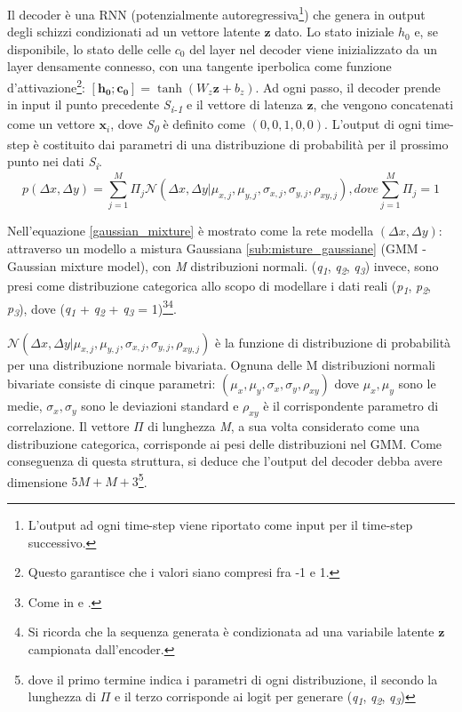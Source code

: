 Il decoder è una RNN (potenzialmente autoregressiva\footnote{L'output ad ogni time-step viene riportato come input per il time-step successivo.}) che genera in output degli schizzi condizionati ad un vettore latente $\boldsymbol{z}$ dato. Lo stato iniziale $h_0$ e, se disponibile, lo stato delle celle $c_0$ del layer nel decoder viene inizializzato da un layer densamente connesso, con una tangente iperbolica come funzione d'attivazione\footnote{Questo garantisce che i valori siano compresi fra -1 e 1.}: $[\boldsymbol{h_0} ; \boldsymbol{c_0}] = \tanh(W_z \boldsymbol{z} + b_z)$.
Ad ogni passo, il decoder prende in input il punto precedente \textit{S\textsubscript{i-1}} e il vettore di latenza $\boldsymbol{z}$, che vengono concatenati come un vettore $\boldsymbol{x}_i$, dove \textit{S\textsubscript{0}} è definito come $(0, 0, 1, 0, 0)$. L'output di ogni time-step è costituito dai parametri di una distribuzione di probabilità per il prossimo punto nei dati \textit{S\textsubscript{i}}.
\begin{equation}
	\label{gaussian_mixture}
	p(\Delta x, \Delta y) = \sum_{j=1}^M \Pi_j \mathcal{N}(\Delta x, \Delta y | \mu_{x,j}, \mu_{y,j}, \sigma_{x,j}, \sigma_{y,j}, \rho_{xy, j}), dove \sum_{j=1}^M \Pi_j = 1
\end{equation}

Nell'equazione \ref{gaussian_mixture} è mostrato come la rete modella $(\Delta x, \Delta y)$: attraverso un modello a mistura Gaussiana \ref{sub:misture_gaussiane} (GMM - Gaussian mixture model), con \textit{M} distribuzioni normali\cite{gmm}. (\textit{q\textsubscript{1}}, \textit{q\textsubscript{2}}, \textit{q\textsubscript{3}}) invece, sono presi come distribuzione categorica allo scopo di modellare i dati reali (\textit{p\textsubscript{1}}, \textit{p\textsubscript{2}}, \textit{p\textsubscript{3}}), dove (\textit{q\textsubscript{1}} + \textit{q\textsubscript{2}} + \textit{q\textsubscript{3}} = 1)\footnote{Come in \cite{fake_chinese} e \cite{draw_chinese}.}\footnote{Si ricorda che la sequenza generata è condizionata ad una variabile latente $\boldsymbol{z}$ campionata dall'encoder.}.

$\mathcal{N}(\Delta x, \Delta y | \mu_{x,j}, \mu_{y,j}, \sigma_{x,j}, \sigma_{y,j}, \rho_{xy, j})$ è la funzione di distribuzione di probabilità per una distribuzione normale bivariata. Ognuna delle M distribuzioni normali bivariate consiste di cinque parametri: $(\mu_{x}, \mu_{y}, \sigma_{x}, \sigma_{y}, \rho_{xy})$ dove $\mu_{x}, \mu_{y}$ sono le medie, $\sigma_{x}, \sigma_{y}$ sono le deviazioni standard e $\rho_{xy}$ è il corrispondente parametro di correlazione. Il vettore $\Pi$ di lunghezza \textit{M}, a sua volta considerato come una distribuzione categorica, corrisponde ai pesi delle distribuzioni nel GMM. Come conseguenza di questa struttura, si deduce che l'output del decoder debba avere dimensione $5M + M + 3$\footnote{dove il primo termine indica i parametri di ogni distribuzione, il secondo la lunghezza di $\Pi$ e il terzo corrisponde ai logit per generare (\textit{q\textsubscript{1}}, \textit{q\textsubscript{2}}, \textit{q\textsubscript{3}})}.

